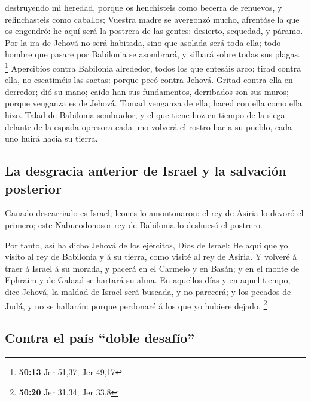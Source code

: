 destruyendo mi heredad, porque os henchisteis como becerra de renuevos,
y relinchasteis como caballos;  Vuestra madre se
avergonzó mucho, afrentóse la que os engendró: he aquí será la postrera
de las gentes: desierto, sequedad, y páramo.  Por la ira
de Jehová no será habitada, sino que asolada será toda ella; todo hombre
que pasare por Babilonia se asombrará, y silbará sobre todas sus plagas.
\footnote{\textbf{50:13} Jer 51,37; Jer 49,17} 
Apercibíos contra Babilonia alrededor, todos los que entesáis arco;
tirad contra ella, no escatiméis las saetas: porque pecó contra Jehová.
 Gritad contra ella en derredor; dió su mano; caído han
sus fundamentos, derribados son sus muros; porque venganza es de Jehová.
Tomad venganza de ella; haced con ella como ella hizo. 
Talad de Babilonia sembrador, y el que tiene hoz en tiempo de la siega:
delante de la espada opresora cada uno volverá el rostro hacia su
pueblo, cada uno huirá hacia su tierra.

\hypertarget{la-desgracia-anterior-de-israel-y-la-salvaciuxf3n-posterior}{%
\subsection{La desgracia anterior de Israel y la salvación
posterior}\label{la-desgracia-anterior-de-israel-y-la-salvaciuxf3n-posterior}}

 Ganado descarriado es Israel; leones lo amontonaron: el
rey de Asiria lo devoró el primero; este Nabucodonosor rey de Babilonia
lo deshuesó el postrero.

 Por tanto, así ha dicho Jehová de los ejércitos, Dios de
Israel: He aquí que yo visito al rey de Babilonia y á su tierra, como
visité al rey de Asiria.  Y volveré á traer á Israel á su
morada, y pacerá en el Carmelo y en Basán; y en el monte de Ephraim y de
Galaad se hartará su alma.  En aquellos días y en aquel
tiempo, dice Jehová, la maldad de Israel será buscada, y no parecerá; y
los pecados de Judá, y no se hallarán: porque perdonaré á los que yo
hubiere dejado. \footnote{\textbf{50:20} Jer 31,34; Jer 33,8}

\hypertarget{contra-el-pauxeds-doble-desafuxedo}{%
\subsection{Contra el país ``doble
desafío''}\label{contra-el-pauxeds-doble-desafuxedo}}

